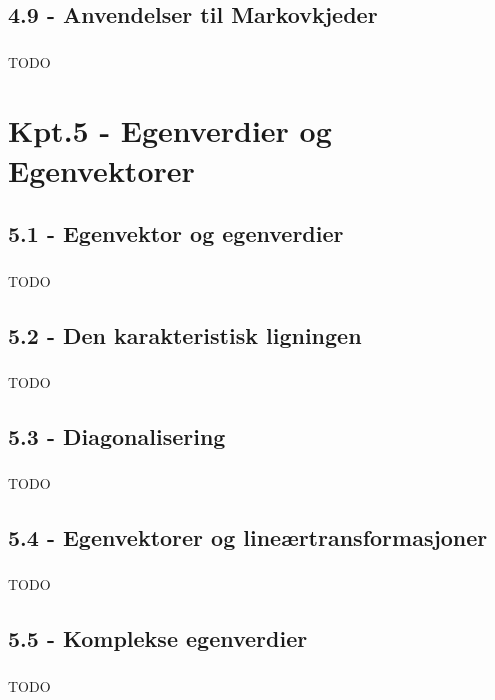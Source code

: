 \documentclass{article}
\begin{document}
    \subsection{4.9 - Anvendelser til Markovkjeder}
      \subsubsection{}
        TODO
  \section{Kpt.5 - Egenverdier og Egenvektorer}
    \subsection{5.1 - Egenvektor og egenverdier}
      \subsubsection{}
        TODO
    \subsection{5.2 - Den karakteristisk ligningen}
      \subsubsection{}
        TODO
    \subsection{5.3 - Diagonalisering}
      \subsubsection{}
        TODO
    \subsection{5.4 - Egenvektorer og lineærtransformasjoner}
      \subsubsection{}
        TODO
    \subsection{5.5 - Komplekse egenverdier}
      \subsubsection{}
        TODO
\end{document}
